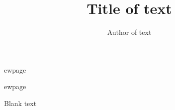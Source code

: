 \documentclass{scrartcl} %
\title{Title of text}
\author{Author of text}
\date{} %
\begin{document}
\begin{titlepage}

\maketitle

\thispagestyle{empty}

\end{titlepage}


ewpage

\tableofcontents


ewpage



Blank text
\end{document}
